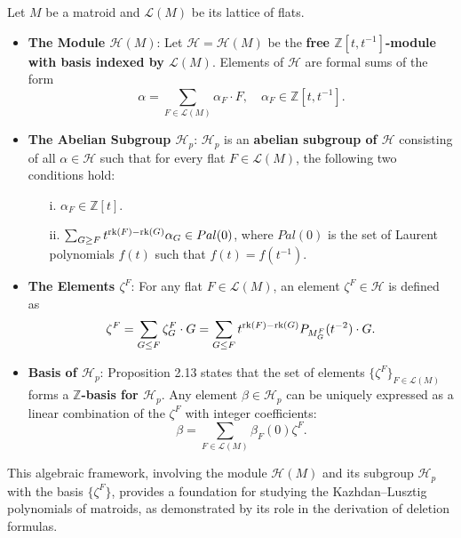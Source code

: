 \documentclass[10pt]{article}
\newcommand{\calL}{\mathcal{L}}
\newcommand{\calH}{\mathcal{H}}
\newcommand{\rank}{\normalfont\text{rk}}
\theoremstyle{remark}
\begin{document}
Let $M$ be a matroid and $\calL(M)$ be its lattice of flats.

\begin{itemize}
    \item \textbf{The Module $\calH(M)$}: Let $\calH = \calH(M)$ be the
    \textbf{free $\mathbb{Z}[t, t^{-1}]$-module with basis indexed by $\calL(M)$}.
    Elements of $\calH$ are formal sums of the form
    \[
    \alpha = \sum_{F \in \calL(M)} \alpha_F \cdot F, \quad \alpha_F \in \mathbb{Z}
    [t, t^{-1}].
    \]

    \item \textbf{The Abelian Subgroup $\calH_p$}: $\calH_p$ is an
    \textbf{abelian subgroup of $\calH$} consisting of all $\alpha \in \calH$
    such that for every flat $F \in \calL(M)$, the following two conditions hold:
    \begin{itemize}
        \item[i.] $\alpha_F \in \mathbb{Z}[t]$.
        \item[ii.] $\sum_{G \geq F} t^{\rank(F) - \rank(G)} \alpha_G \in Pal(0)$, where $Pal(0)$ is the set of Laurent polynomials $f(t)$ such that $f(t) = f(t^{-1})$.
    \end{itemize}

    \item \textbf{The Elements $\zeta^F$}: For any flat $F \in \calL(M)$, an element
    $\zeta^F \in \calH$ is defined as
    \[
    \zeta^F = \sum_{G \leq F} \zeta_G^F \cdot G = \sum_{G \leq F} t^{\rank(F) - \rank(G)} P_{M_G^F}(t^{-2}) \cdot G.
    \]
    \item \textbf{Basis of $\calH_p$}: Proposition 2.13 states that the set of elements
    $\{\zeta^F\}_{F \in \calL(M)}$ forms a \textbf{$\mathbb{Z}$-basis for $\calH_p$}.
    Any element $\beta \in \calH_p$ can be uniquely expressed as a linear combination of
    the $\zeta^F$ with integer coefficients:
    \[
    \beta = \sum_{F \in \calL(M)} \beta_F(0) \zeta^F.
    \]
\end{itemize}

This algebraic framework, involving the module $\calH(M)$ and its subgroup $\calH_p$ with the basis $\{\zeta^F\}$, provides a foundation for studying the Kazhdan–Lusztig polynomials of matroids, as demonstrated by its role in the derivation of deletion formulas. %

\printbibliography %
\end{document}
